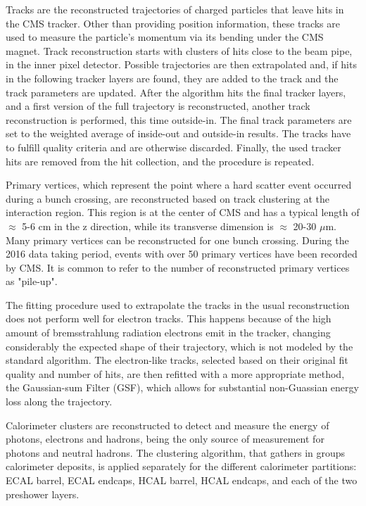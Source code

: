 Tracks are the reconstructed trajectories of charged particles that leave hits in the CMS tracker. 
Other than providing position information, these tracks are used to measure the particle's momentum via its bending under the CMS magnet. 
Track reconstruction starts with clusters of hits close to the beam pipe, in the inner pixel detector. 
Possible trajectories are then extrapolated and, if hits in the following tracker layers are found, they are added to the track and the track parameters are updated. 
After the algorithm hits the final tracker layers, and a first version of the full trajectory is reconstructed, another track reconstruction is performed, this time outside-in. 
The final track parameters are set to the weighted average of inside-out and outside-in results. 
The tracks have to fulfill quality criteria and are otherwise discarded. 
Finally, the used tracker hits are removed from the hit collection, and the procedure is repeated.

Primary vertices, which represent the point where a hard scatter event occurred during a bunch crossing, are reconstructed based on track clustering at the interaction region. 
This region is at the center of CMS and has a typical length of $\approx$ 5-6 cm in the z direction, while its transverse dimension is $\approx$ 20-30 $\mu$m. 
Many primary vertices can be reconstructed for one bunch crossing. 
During the 2016 data taking period, events with over 50 primary vertices have been recorded by CMS. 
It is common to refer to the number of reconstructed primary vertices as "pile-up".

The fitting procedure used to extrapolate the tracks in the usual reconstruction does not perform well for electron tracks. 
This happens because of the high amount of bremsstrahlung radiation electrons emit in the tracker, changing considerably the expected shape of their trajectory, which is not modeled by the standard algorithm. 
The electron-like tracks, selected based on their original fit quality and number of hits, are then refitted with a more appropriate method, the Gaussian-sum Filter (GSF), which allows for substantial non-Guassian energy loss along the trajectory.

Calorimeter clusters are reconstructed to detect and measure the energy of photons, electrons and hadrons, being the only source of measurement for photons and neutral hadrons. 
The clustering algorithm, that gathers in groups calorimeter deposits, is applied separately for the different calorimeter partitions: ECAL barrel, ECAL endcaps, HCAL barrel, HCAL endcaps, and each of the two preshower layers. 

